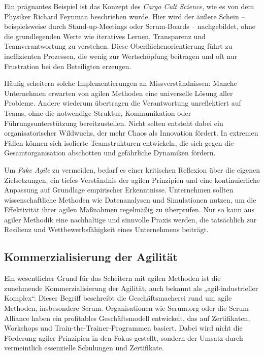 \documentclass[ngerman]{seminarvorlage}
\begin{document}
Ein prägnantes Beispiel ist das Konzept des \textit{Cargo Cult Science}, wie es von dem Physiker Richard Feynman beschrieben wurde. Hier wird der äußere Schein – beispielsweise durch Stand-up-Meetings oder Scrum-Boards – nachgebildet, ohne die grundlegenden Werte wie iteratives Lernen, Transparenz und Teamverantwortung zu verstehen. Diese Oberflächenorientierung führt zu ineffizienten Prozessen, die wenig zur Wertschöpfung beitragen und oft nur Frustration bei den Beteiligten erzeugen.

Häufig scheitern solche Implementierungen an Missverständnissen: Manche Unternehmen erwarten von agilen Methoden eine universelle Lösung aller Probleme. Andere wiederum übertragen die Verantwortung unreflektiert auf Teams, ohne die notwendige Struktur, Kommunikation oder Führungsunterstützung bereitzustellen. Nicht selten entsteht dabei ein organisatorischer Wildwuchs, der mehr Chaos als Innovation fördert. In extremen Fällen können sich isolierte Teamstrukturen entwickeln, die sich gegen die Gesamtorganisation abschotten und gefährliche Dynamiken fördern.

Um \textit{Fake Agile} zu vermeiden, bedarf es einer kritischen Reflexion über die eigenen Zielsetzungen, ein tiefes Verständnis der agilen Prinzipien und eine kontinuierliche Anpassung auf Grundlage empirischer Erkenntnisse. Unternehmen sollten wissenschaftliche Methoden wie Datenanalysen und Simulationen nutzen, um die Effektivität ihrer agilen Maßnahmen regelmäßig zu überprüfen. Nur so kann aus agiler Methodik eine nachhaltige und sinnvolle Praxis werden, die tatsächlich zur Resilienz und Wettbewerbsfähigkeit eines Unternehmens beiträgt.
\cite{Mucke.2024}

\subsection{Kommerzialisierung der Agilität}

Ein wesentlicher Grund für das Scheitern mit agilen Methoden ist die zunehmende Kommerzialisierung der Agilität, auch bekannt als „agil-industrieller Komplex“. Dieser Begriff beschreibt die Geschäftsmacherei rund um agile Methoden, insbesondere Scrum. Organisationen wie Scrum.org oder die Scrum Alliance haben ein profitables Geschäftsmodell entwickelt, das auf Zertifikaten, Workshops und Train-the-Trainer-Programmen basiert. Dabei wird nicht die Förderung agiler Prinzipien in den Fokus gestellt, sondern der Umsatz durch vermeintlich essenzielle Schulungen und Zertifikate.
\end{document}
